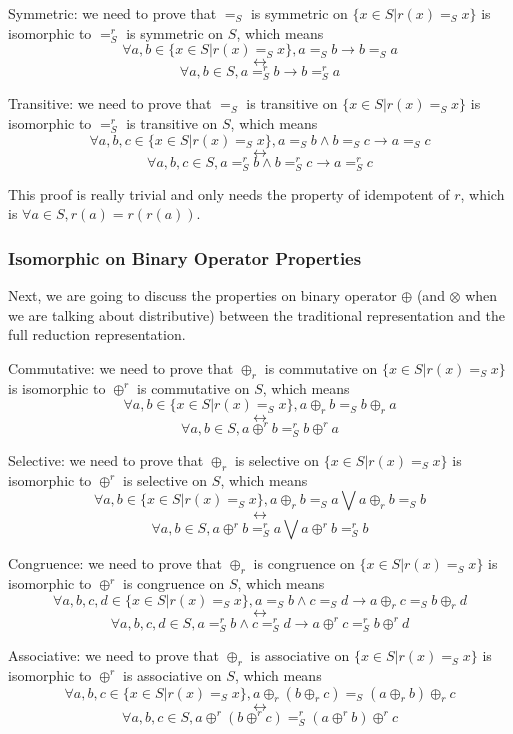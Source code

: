 \documentclass[a4paper,12pt,twoside,openright]{report}
\begin{document}
Symmetric: we need to prove that $=_S$ is symmetric on $\{x \in S | r(x) =_S x\}$ is isomorphic to $=^r_S$ is symmetric on $S$, which means 
\[\forall a,b \in \{x \in S | r(x) =_S x \}, a =_S b \rightarrow b =_S a \]
\[\longleftrightarrow \]
\[\forall a,b \in S, a =^r_S b \rightarrow b =^r_S a
\]

Transitive: we need to prove that $=_S$ is transitive on $\{x \in S | r(x) =_S x \}$ is isomorphic to $=^r_S$ is transitive on $S$, which means 
\[\forall a,b,c \in \{x \in S | r(x) =_S x \}, a =_S b \wedge b =_S c \rightarrow a =_S c \]
\[\longleftrightarrow \]
\[\forall a,b,c \in S, a =^r_S b \wedge b =^r_S c \rightarrow a =^r_S c
\]

This proof is really trivial and only needs the property of idempotent of $r$, which is $\forall a \in S, r(a) = r(r(a))$. 

\subsubsection{Isomorphic on Binary Operator Properties}
Next, we are going to discuss the properties on binary operator $\oplus$ (and $\otimes$ when we are talking about distributive) between the traditional representation and the full reduction representation.

Commutative: we need to prove that $\oplus_r$ is commutative on $\{x \in S | r(x) =_S x\}$ is isomorphic to $\oplus^r$ is commutative on $S$, which means 
\[\forall a,b \in \{x \in S | r(x) =_S x \}, a \oplus_r b =_S b \oplus_r a \]
\[\longleftrightarrow \]
\[\forall a,b \in S, a \oplus^r b =^r_S b \oplus^r a
\]

Selective: we need to prove that $\oplus_r$ is selective on $\{x \in S | r(x) =_S x\}$ is isomorphic to $\oplus^r$ is selective on $S$, which means 
\[\forall a,b \in \{x \in S | r(x) =_S x\}, a \oplus_r b =_S a \bigvee a \oplus_r b =_S b \]
\[\longleftrightarrow \]
\[\forall a,b \in S, a \oplus^r b =^r_S a \bigvee a \oplus^r b =^r_S b
\]

Congruence: we need to prove that $\oplus_r$ is congruence on $\{x \in S | r(x) =_S x\}$ is isomorphic to $\oplus^r$ is congruence on $S$, which means 
\[\forall a,b,c,d \in \{x \in S | r(x) =_S x \}, a =_S b \wedge c =_S d \rightarrow a \oplus_r c =_S b \oplus_r d \]
\[\longleftrightarrow \]
\[\forall a,b,c,d \in S, a =^r_S b \wedge c =^r_S d \rightarrow a \oplus^r c =^r_S b \oplus^r d
\]

Associative: we need to prove that $\oplus_r$ is associative on $\{x \in S | r(x) =_S x\}$ is isomorphic to $\oplus^r$ is associative on $S$, which means 
\[\forall a,b,c \in \{x \in S | r(x) =_S x \}, a \oplus_r (b \oplus_r c) =_S (a \oplus_r b) \oplus_r c \]
\[\longleftrightarrow \]
\[\forall a,b,c \in S, a \oplus^r (b \oplus^r c) =^r_S (a \oplus^r b) \oplus^r c
\]
\end{document}
